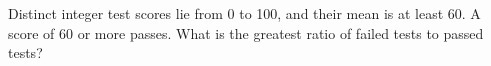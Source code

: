 Distinct integer test scores lie from 0 to 100, and their mean is at least 60. A score of 60 or more passes. What is the greatest ratio of failed tests to passed tests?
